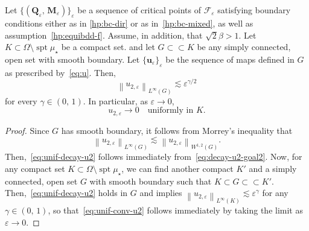\documentclass[10pt,a4paper]{amsart}
\DeclareMathOperator{\spt}{spt}                                     %
\newcommand{\F}{\mathscr{F}}
\newcommand{\M}{\mathbf{M}}
\newcommand{\Q}{\mathbf{Q}}
\newcommand{\csubset}{\subset\!\subset}                             %
\newcommand{\eps}{\varepsilon}
\newcommand{\norm}[1]{\left\| #1 \right\|}                          %
\renewcommand{\u}{\mathbf{u}}
\begin{document}
\begin{corollary}\label{cor:unif-conv-u2}
	Let $\{(\Q_\eps,\,\M_\eps)\}_\eps$ be a sequence of critical points of 
	$\F_\eps$ satisfying boundary conditions either as in \eqref{hp:bc-dir} or as 
	in~\eqref{hp:bc-mixed}, as well as assumption~\eqref{hp:equibdd-f}. 
    Assume, in addition, that $\sqrt{2}\beta > 1$. 
    Let $K \subset \Omega \setminus \spt\mu_\star$ be a compact set.  
    and let $G \csubset K$ be any simply connected, open set with smooth boundary.   
    Let $\{\u_\eps\}_\eps$ be the sequence of maps defined in $G$ as prescribed by~\eqref{eq:u}. Then,
    \begin{equation}\label{eq:unif-decay-u2}
    	\norm{u_{2,\eps}}_{L^\infty(G)} \lesssim \eps^{\gamma/2}
    \end{equation}
    for every $\gamma \in (0,\,1)$. In particular, as $\eps \to 0$, 
    \begin{equation}\label{eq:unif-conv-u2}
    	u_{2,\eps} \to 0 \quad \mbox{uniformly in } K.
    \end{equation}
\end{corollary}

\begin{proof}
	Since $G$ has smooth boundary, it follows from Morrey's inequality 
	that
	\[
		\norm{u_{2,\eps}}_{L^\infty(G)} \lesssim \norm{u_{2,\eps}}_{W^{1,2}(G)}. 
	\]
	Then,~\eqref{eq:unif-decay-u2} follows immediately from~\eqref{eq:decay-u2-goal2}. 
	Now, for any compact set 
	$K \subset \Omega \setminus \spt\mu_\star$, we can find another compact 
	$K'$ and a simply connected, open set $G$ with smooth boundary such 
	that $K \subset G \csubset K'$. Then,~\eqref{eq:unif-decay-u2} holds 
	in $G$ and implies $\norm{u_{2,\eps}}_{L^\infty(K)} \lesssim \eps^{\gamma}$ for 
	any $\gamma \in (0,\,1)$, so that~\eqref{eq:unif-conv-u2} follows 
	immediately by taking the limit as $\eps \to 0$. 
\end{proof}
\end{document}
